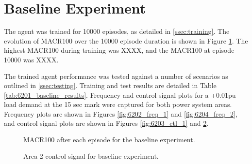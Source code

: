 \section{Baseline Experiment}
The agent was trained for 10000 episodes, as detailed in \textsection \ref{ssec:training}. The evolution of MACR100 over the 10000 episode duration is shown in Figure \ref{fig:6201_average_reward}. The highest MACR100 during training was XXXX, and the MACR100 at episode 10000 was XXXX.

The trained agent performance was tested against a number of scenarios as outlined in \textsection \ref{ssec:testing}. Training and test results are detailed in Table \ref{tab:6201_baseline_results}. Frequency and control signal plots for a +0.01pu load demand at the 15 sec mark were captured for both power system areas. Frequency plots are shown in Figures \ref{fig:6202_freq_1} and \ref{fig:6204_freq_2}, and control signal plots are shown in Figures \ref{fig:6203_ctl_1} and \ref{fig:6205_ctl_2}.

\begin{figure}[h]
	\centering
	
	\caption{MACR100 after each episode for the baseline experiment.}
	\label{fig:6201_average_reward}
\end{figure}





\begin{figure}[h]
	\centering
	
	\vspace{-0.5cm}
	\caption[Experiment 1 Area 1 frequency]{Area 1 frequency response for baseline experiment.}\label{fig:6202_freq_1}
	
	\vspace{0.5cm}
	
	
	\vspace{-0.5cm}
	\caption[Experiment 1 Area 1 control signal]{Area 1 control signal for baseline experiment.}\label{fig:6203_ctl_1}
	
	\vspace{0.5cm}
	
	
	\vspace{-0.5cm}
	\caption[Experiment 1 Area 2 frequency]{Area 2 frequency response for baseline experiment.}\label{fig:6204_freq_2}
	
	\vspace{0.5cm}
		
	
	\vspace{-0.5cm}
	\caption[Experiment 1 Area 2 control signal]{Area 2 control signal for baseline experiment.}\label{fig:6205_ctl_2}
\end{figure}